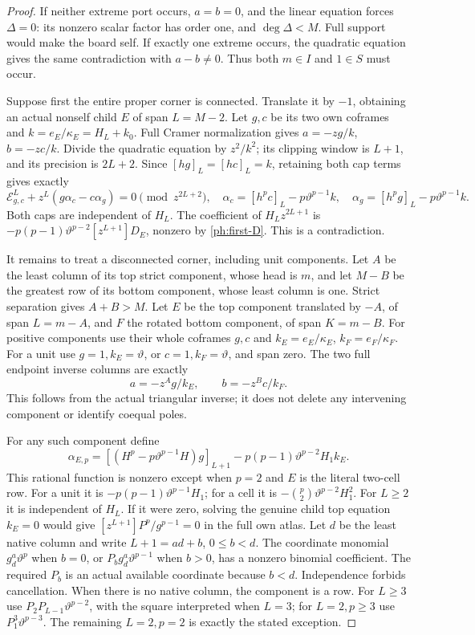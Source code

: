 \documentclass[11pt,a4paper]{amsart}
\numberwithin{equation}{section}
\theoremstyle{plain}
\theoremstyle{definition}
\begin{document}
\begin{proof}
If neither extreme port occurs, \(a=b=0\), and the linear equation
forces \(\Delta=0\): its nonzero scalar factor has order one, and
\(\deg\Delta<M\).  Full support would make the board self.
If exactly one extreme occurs, the quadratic equation gives the same
contradiction with \(a-b\ne0\).
Thus both \(m\in I\) and \(1\in S\) must occur.

Suppose first the entire proper corner is connected.  Translate it by
\(-1\), obtaining an actual nonself child \(E\) of span \(L=M-2\).
Let \(g,c\) be its two own coframes and
\(k=e_E/\kappa_E=H_L+k_0\).
Full Cramer normalization gives \(a=-zg/k\), \(b=-zc/k\).
Divide the quadratic equation by \(z^2/k^2\); its clipping window is
\(L+1\), and its precision is \(2L+2\).
Since \([hg]_L=[hc]_L=k\), retaining both cap terms gives exactly
\[
 \mathcal{E}^{L}_{g,c}
       +z^L(g\alpha_c-c\alpha_g)=0\pmod{z^{2L+2}},
 \quad
 \alpha_c=[h^pc]_L-p\vartheta^{p-1}k,\quad
 \alpha_g=[h^pg]_L-p\vartheta^{p-1}k.
\]
Both caps are independent of \(H_L\).
The coefficient of \(H_Lz^{2L+1}\) is
\(-p(p-1)\vartheta^{p-2}[z^{L+1}]D_E\), nonzero by
\eqref{ph:first-D}.  This is a contradiction.

It remains to treat a disconnected corner, including unit components.
Let \(A\) be the least column of its top strict component, whose head
is \(m\), and let \(M-B\) be the greatest row of its bottom component,
whose least column is one.  Strict separation gives \(A+B>M\).
Let \(E\) be the top component translated by \(-A\), of span
\(L=m-A\), and \(F\) the rotated bottom component, of span \(K=m-B\).
For positive components use their whole coframes \(g,c\) and
\(k_E=e_E/\kappa_E\), \(k_F=e_F/\kappa_F\).  For a unit use
\(g=1,k_E=\vartheta\), or \(c=1,k_F=\vartheta\), and span zero.
The two full endpoint inverse columns are exactly
\[
 a=-z^Ag/k_E,\qquad b=-z^Bc/k_F.
\]
This follows from the actual triangular inverse; it does not delete any
intervening component or identify coequal poles.

For any such component define
\[
 \alpha_{E,p}
   =[(H^p-p\vartheta^{p-1}H)g]_{L+1}
                   -p(p-1)\vartheta^{p-2}H_1k_E.
\]
This rational function is nonzero except when \(p=2\) and \(E\) is
the literal two-cell row.
For a unit it is \(-p(p-1)\vartheta^{p-1}H_1\); for a cell it is
\(-\binom p2\vartheta^{p-2}H_1^2\).
For \(L\ge2\) it is independent of \(H_L\).
If it were zero, solving the genuine child top equation \(k_E=0\)
would give
\([z^{L+1}]P^p/g^{p-1}=0\) in the full own atlas.
Let \(d\) be the least native column and write \(L+1=ad+b\),
\(0\le b<d\).  The coordinate monomial \(g_d^a \vartheta^p\) when \(b=0\),
or \(P_b g_d^a \vartheta^{p-1}\) when \(b>0\), has a nonzero binomial
coefficient.  The required \(P_b\) is an actual available coordinate
because \(b<d\).  Independence forbids cancellation.
When there is no native column, the component is a row.
For \(L\ge3\) use \(P_2P_{L-1}\vartheta^{p-2}\), with the square interpreted
when \(L=3\); for \(L=2,p\ge3\) use \(P_1^3\vartheta^{p-3}\).
The remaining \(L=2,p=2\) is exactly the stated exception.


\end{proof}
\end{document}
